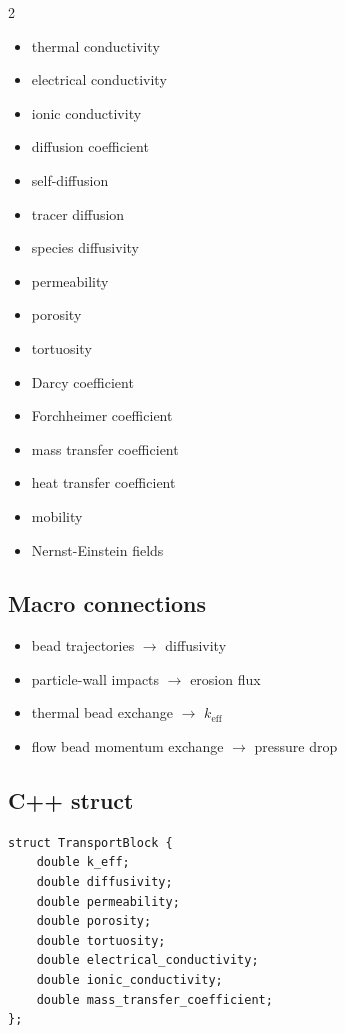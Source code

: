 \documentclass[11pt, a4paper]{article}
\begin{document}
\begin{multicols}{2}
\begin{itemize}[itemsep=1pt, leftmargin=*]
  \item thermal conductivity
  \item electrical conductivity
  \item ionic conductivity
  \item diffusion coefficient
  \item self-diffusion
  \item tracer diffusion
  \item species diffusivity
  \item permeability
  \item porosity
  \item tortuosity
  \item Darcy coefficient
  \item Forchheimer coefficient
  \item mass transfer coefficient
  \item heat transfer coefficient
  \item mobility
  \item Nernst-Einstein fields
\end{itemize}
\end{multicols}

\subsection{Macro connections}

\begin{itemize}[itemsep=1pt, leftmargin=*]
  \item bead trajectories $\rightarrow$ diffusivity
  \item particle-wall impacts $\rightarrow$ erosion flux
  \item thermal bead exchange $\rightarrow$ $k_\text{eff}$
  \item flow bead momentum exchange $\rightarrow$ pressure drop
\end{itemize}

\subsection{C++ struct}

\begin{lstlisting}
struct TransportBlock {
    double k_eff;
    double diffusivity;
    double permeability;
    double porosity;
    double tortuosity;
    double electrical_conductivity;
    double ionic_conductivity;
    double mass_transfer_coefficient;
};
\end{lstlisting}
\end{document}
